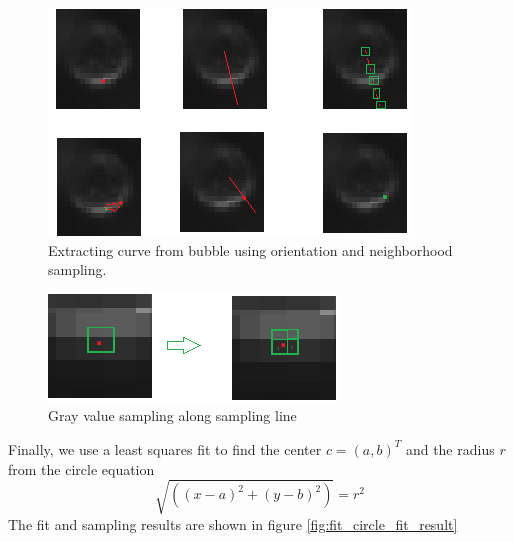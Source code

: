 				 \begin{figure}
				 	\centering
				 	\includegraphics[scale=1]{images/curve_from_orientation.png}
				 	\caption{Extracting curve from bubble using orientation and neighborhood sampling.}
				 	\label{fig:curve_from_orientation}
				 \end{figure}
				 
				 \begin{figure}
				 	\centering
				 	\includegraphics[scale=1]{images/subpixel_sampling.png}
				 	\caption{Gray value sampling along sampling line}
				 	\label{fig:subpixel_sampling}
				 \end{figure}
				 
				
				Finally, we use a least squares fit to find the center $c = (a,b)^T$ and the radius $r$ from the circle equation
				\begin{equation}
					\sqrt{ \left( (x-a)^2 + (y-b)^2 \right)} = r^2
				\end{equation}
				The fit and sampling results are shown in figure \ref{fig:fit_circle_fit_result}
				
